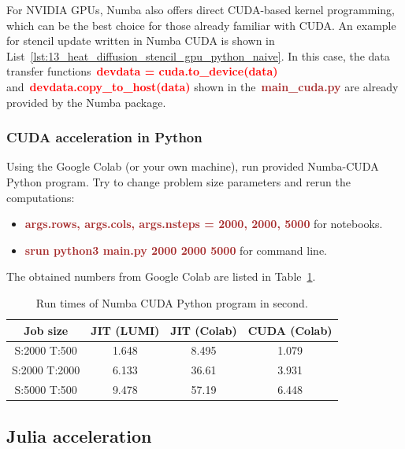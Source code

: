 \par
For NVIDIA GPUs, Numba also offers direct CUDA-based kernel programming, which can be the best choice for those already familiar with CUDA.
An example for stencil update written in Numba CUDA is shown in List~\ref{lst:13_heat_diffusion_stencil_gpu_python_naive}.
In this case, the data transfer functions~\textbf{\textcolor{red}{devdata = cuda.to\_device(data)}} and~\textbf{\textcolor{red}{devdata.copy\_to\_host(data)}} shown in the~\textbf{\textcolor{brown}{main\_cuda.py}} are already provided by the Numba package.


\subsubsection{CUDA acceleration in Python}


\par
Using the Google Colab (or your own machine), run provided Numba-CUDA Python program.
Try to change problem size parameters and rerun the computations:
\begin{itemize}
    \item \textbf{\textcolor{brown}{args.rows, args.cols, args.nsteps = 2000, 2000, 5000}} for notebooks.
    \item \textbf{\textcolor{brown}{srun python3 main.py 2000 2000 5000}} for command line.
\end{itemize}


\par
The obtained numbers from Google Colab are listed in Table~\ref{tbl:gpu_python_google_colab_numba}.


\begin{table}[!h]
\centering\caption{Run times of Numba CUDA Python program in second.}\label{tbl:gpu_python_google_colab_numba}
\begin{tabular}{ |c|c|c|c| } 
\hline
\textbf{Job size} & \textbf{JIT (LUMI)} & \textbf{JIT (Colab)} & \textbf{CUDA (Colab)} \\
\hline
S:2000 T:500 & 1.648 & 8.495 & 1.079 \\
S:2000 T:2000 & 6.133 & 36.61 & 3.931 \\
S:5000 T:500 & 9.478 & 57.19 & 6.448 \\
\hline
\end{tabular}
\end{table}




\subsection{Julia acceleration}


